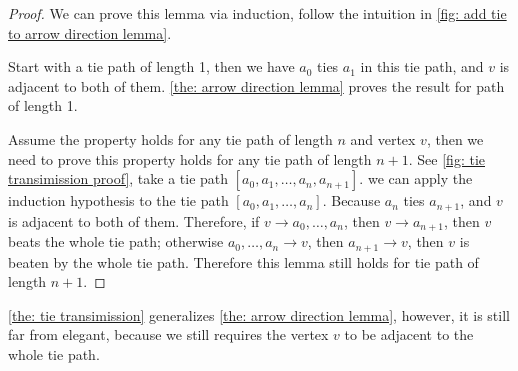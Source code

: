\begin{proof}
  We can prove this lemma via induction,
  follow the intuition in
  \cref{fig: add tie to arrow direction lemma}.

  Start with a tie path of length 1,
  then we have \(a_0\) ties \(a_1\) in this tie path,
  and \(v\) is adjacent to both of them.
  \cref{the: arrow direction lemma} proves the result
  for path of length 1.

  Assume the property holds for
  any tie path of length \(n\) and vertex \(v\),
  then we need to prove this property holds for
  any tie path of length \(n + 1\).
  See \cref{fig: tie transimission proof},
  take a tie path \([a_0, a_1, \ldots, a_n, a_{n+1}]\).
  we can apply the induction hypothesis to the
  tie path \([a_0, a_1, \ldots, a_n]\).
  Because \(a_n\) ties \(a_{n+1}\), and
  \(v\) is adjacent to both of them.
  Therefore,
  if \(v \to {a_0, \ldots, a_n}\), then \(v \to a_{n+1}\),
  then \(v\) beats the whole tie path;
  otherwise \({a_0, \ldots, a_n} \to v\), then \(a_{n+1} \to v\),
  then \(v\) is beaten by the whole tie path.
  Therefore this lemma still holds for tie path of length \(n + 1\).
\end{proof}

\cref{the: tie transimission} generalizes
\cref{the: arrow direction lemma},
however, it is still far from elegant,
because we still requires the vertex \(v\)
to be adjacent to the whole tie path.

